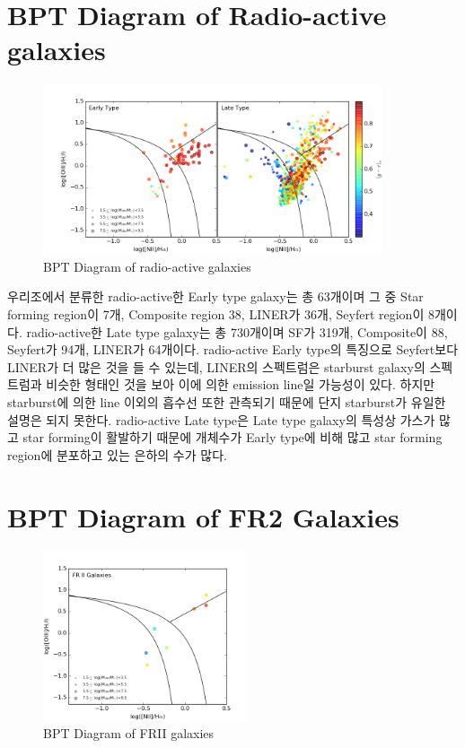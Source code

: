 \documentclass[a4paper,11pt]{article}
\begin{document}
\section{BPT Diagram of Radio-active galaxies}

\begin{figure}[h]
\centering
\includegraphics[height=50mm, width=100mm]{BPT_radio_Active.png}
\caption{\label{fig:ii} BPT Diagram of radio-active galaxies}
\end{figure}

우리조에서 분류한 radio-active한 Early type galaxy는 총 63개이며 그 중 Star forming region이 7개, Composite region 38, LINER가 36개, Seyfert region이 8개이다.
radio-active한 Late type galaxy는 총 730개이며 SF가 319개, Composite이 88, Seyfert가 94개, LINER가 64개이다. radio-active Early type의 특징으로 Seyfert보다 LINER가 더 많은 것을 
들 수 있는데, LINER의 스펙트럼은 starburst galaxy의 스펙트럼과 비슷한 형태인 것을 보아 이에 의한 emission line일 가능성이 있다.
하지만 starburst에 의한 line 이외의 흡수선 또한 관측되기 때문에 단지 starburst가 유일한 설명은 되지 못한다. radio-active Late type은 Late type galaxy의 특성상 가스가 많고 
star forming이 활발하기 때문에 개체수가 Early type에 비해 많고 star forming region에 분포하고 있는 은하의 수가 많다. 

\section{BPT Diagram of FR2 Galaxies}

\begin{figure}[h]
\centering
\includegraphics[height=50mm, width=60mm]{BPT_frII.png}
\caption{\label{fig:iii} BPT Diagram of FRII galaxies}
\end{figure}
\end{document}
